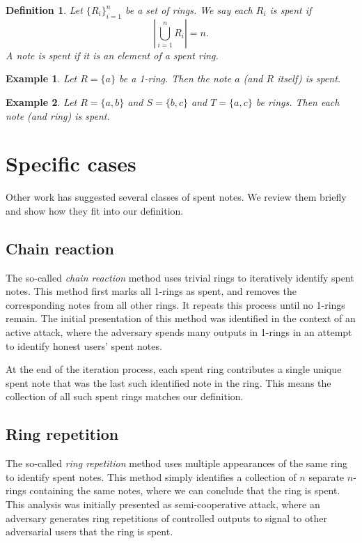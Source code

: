 \documentclass{mrl}
\newtheorem{definition}{Definition}
\newtheorem{example}{Example}
\begin{document}
\begin{definition}
Let $\{R_i\}_{i=1}^n$ be a set of rings. We say each $R_i$ is \textit{spent} if $$\left| \bigcup_{i=1}^n R_i \right| = n.$$ A note is \textit{spent} if it is an element of a spent ring.
\end{definition}

\begin{example}
Let $R = \{a\}$ be a 1-ring. Then the note $a$ (and $R$ itself) is spent.
\end{example}

\begin{example}
Let $R = \{a,b\}$ and $S = \{b,c\}$ and $T = \{a,c\}$ be rings. Then each note (and ring) is spent.
\end{example}

\section{Specific cases}
Other work has suggested several classes of spent notes. We review them briefly and show how they fit into our definition.

\subsection{Chain reaction}
The so-called \textit{chain reaction} method uses trivial rings to iteratively identify spent notes. This method first marks all 1-rings as spent, and removes the corresponding notes from all other rings. It repeats this process until no 1-rings remain. The initial presentation of this method was identified in the context of an active attack, where the adversary spends many outputs in 1-rings in an attempt to identify honest users' spent notes.

At the end of the iteration process, each spent ring contributes a single unique spent note that was the last such identified note in the ring. This means the collection of all such spent rings matches our definition.

\subsection{Ring repetition}
The so-called \textit{ring repetition} method uses multiple appearances of the same ring to identify spent notes. This method simply identifies a collection of $n$ separate $n$-rings containing the same notes, where we can conclude that the ring is spent. This analysis was initially presented as semi-cooperative attack, where an adversary generates ring repetitions of controlled outputs to signal to other adversarial users that the ring is spent.
\end{document}
